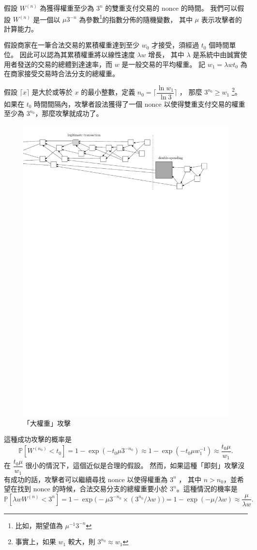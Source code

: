 \documentclass[12pt]{article}
\newcommand{\IP}{\mathbb{P}}
\begin{document}
\begin{CJK}{UTF8}{bkai}
假設 $W^{(n)}$ 為獲得權重至少為 $3^n$ 的雙重支付交易的 nonce 的時間。
我們可以假設 $W^{(n)}$ 是一個以 $\mu3^{-n}$ 為參數\footnote{比如，期望值為 $\mu^{-1}3^{-n}$ }的指數分佈的隨機變數，
其中 $\mu$ 表示攻擊者的計算能力。

假設商家在一筆合法交易的累積權重達到至少 $w_0$ 才接受，須經過 $t_0$ 個時間單位。
因此可以認為其累積權重將以線性速度 $\lambda w$ 增長，
其中 $\lambda$ 是系統中由誠實使用者發送的交易的總體到達速率，而 $w$ 是一般交易的平均權重。
記 $w_1=\lambda wt_0$ 為在商家接受交易時合法分支的總權重。

假設 $\lceil x\rceil$ 是大於或等於 $x$ 的最小整數，定義 $n_0=\lceil\dfrac{\ln{w_1}}{\ln3}\rceil$ ，
那麼 $3^{n_0}\geq w_1$ \footnote{事實上，如果 $w_1$ 較大，則 $3^{n_0}\approx w_1$ }。
如果在 $t_0$  時間間隔內，攻擊者設法獲得了一個 nonce 以使得雙重支付交易的權重至少為 $3^{n_0}$，那麼攻擊就成功了。
\begin{figure}
  \centering \includegraphics[width=\textwidth]{bigPoW} 
 \caption{「大權重」攻擊}
 \label{f_bigPoW}
 \end{figure}
這種成功攻擊的概率是
\[
 \IP[W^{(n_0)}<t_0]=1-\exp(-t_0\mu 3^{-n_0})
  \approx 1-\exp(-t_0\mu w_1^{-1})
  \approx \frac{t_0\mu}{w_1}.
\]
在 $\dfrac{t_0\mu}{w_1}$ 很小的情況下，這個近似是合理的假設。
然而，如果這種「即刻」攻擊沒有成功的話，攻擊者可以繼續尋找 nonce 以使得權重為 $3^n$ ，
其中 $n>n_0$，並希望在找到 nonce 的時候，合法交易分支的總權重要小於 $3^n$。這種情況的機率是
\[
 \IP[\lambda w W^{(n)}<3^n]
=1-\exp\big(-\mu 3^{-n_0}\times (3^{n_0}/\lambda w)\big)
  = 1-\exp(- \mu/\lambda w)
  \approx \frac{\mu}{\lambda w}.
\]


\end{CJK}
\end{document}
